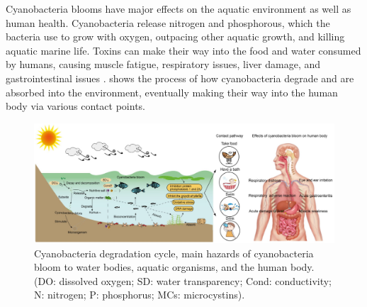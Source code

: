 Cyanobacteria blooms have major effects on the aquatic environment as well as human health. Cyanobacteria release nitrogen and phosphorous, which the bacteria use to grow with oxygen, outpacing other aquatic growth, and killing aquatic marine life. Toxins can make their way into the food and water consumed by humans, causing muscle fatigue, respiratory issues, liver damage, and gastrointestinal issues \cite{zhangImpactCyanobacteriaBlooms2022}.  shows the process of how cyanobacteria degrade and are absorbed into the environment, eventually making their way into the human body via various contact points. 
\begin{figure}
    \centering
    \includegraphics[width=0.75\linewidth]{Chapters/Figures/cyanobacteria_bloom_cycle.png}
    \caption{Cyanobacteria degradation cycle, main hazards of cyanobacteria bloom to water bodies, aquatic organisms, and the human body. (DO: dissolved oxygen; SD: water transparency; Cond: conductivity; N: nitrogen; P: phosphorus; MCs: microcystins). \cite{zhangImpactCyanobacteriaBlooms2022}}
    \label{fig:cyanobacteria_bloom_cycle}
\end{figure}
